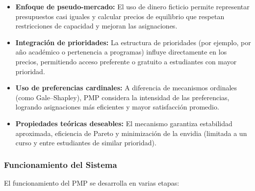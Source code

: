 \documentclass{article}
\begin{document}
\begin{itemize}
    \item \textbf{Enfoque de pseudo-mercado:} El uso de dinero ficticio permite representar presupuestos casi iguales y calcular precios de equilibrio que respetan restricciones de capacidad y mejoran las asignaciones.
    
    \item \textbf{Integración de prioridades:} La estructura de prioridades (por ejemplo, por año académico o pertenencia a programas) influye directamente en los precios, permitiendo acceso preferente o gratuito a estudiantes con mayor prioridad.
    
    \item \textbf{Uso de preferencias cardinales:} A diferencia de mecanismos ordinales (como Gale–Shapley), PMP considera la intensidad de las preferencias, logrando asignaciones más eficientes y mayor satisfacción promedio.
    
    \item \textbf{Propiedades teóricas deseables:} El mecanismo garantiza estabilidad aproximada, eficiencia de Pareto y minimización de la envidia (limitada a un curso y entre estudiantes de similar prioridad).
\end{itemize}

\subsubsection{Funcionamiento del Sistema}

El funcionamiento del PMP se desarrolla en varias etapas:
\end{document}
